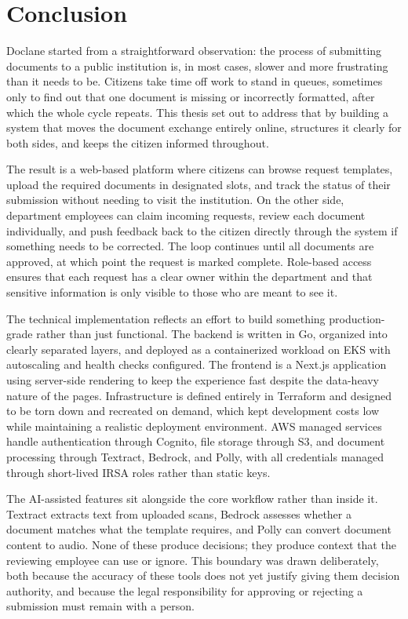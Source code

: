 \chapter{Conclusion}
\label{chap:conclusion}

\par Doclane started from a straightforward observation: the process of submitting documents to a public institution is, in most cases, slower and more frustrating than it needs to be. Citizens take time off work to stand in queues, sometimes only to find out that one document is missing or incorrectly formatted, after which the whole cycle repeats. This thesis set out to address that by building a system that moves the document exchange entirely online, structures it clearly for both sides, and keeps the citizen informed throughout.

\par The result is a web-based platform where citizens can browse request templates, upload the required documents in designated slots, and track the status of their submission without needing to visit the institution. On the other side, department employees can claim incoming requests, review each document individually, and push feedback back to the citizen directly through the system if something needs to be corrected. The loop continues until all documents are approved, at which point the request is marked complete. Role-based access ensures that each request has a clear owner within the department and that sensitive information is only visible to those who are meant to see it.

\par The technical implementation reflects an effort to build something production-grade rather than just functional. The backend is written in Go, organized into clearly separated layers, and deployed as a containerized workload on EKS with autoscaling and health checks configured. The frontend is a Next.js application using server-side rendering to keep the experience fast despite the data-heavy nature of the pages. Infrastructure is defined entirely in Terraform and designed to be torn down and recreated on demand, which kept development costs low while maintaining a realistic deployment environment. AWS managed services handle authentication through Cognito, file storage through S3, and document processing through Textract, Bedrock, and Polly, with all credentials managed through short-lived IRSA roles rather than static keys.

\par The AI-assisted features sit alongside the core workflow rather than inside it. Textract extracts text from uploaded scans, Bedrock assesses whether a document matches what the template requires, and Polly can convert document content to audio. None of these produce decisions; they produce context that the reviewing employee can use or ignore. This boundary was drawn deliberately, both because the accuracy of these tools does not yet justify giving them decision authority, and because the legal responsibility for approving or rejecting a submission must remain with a person.

